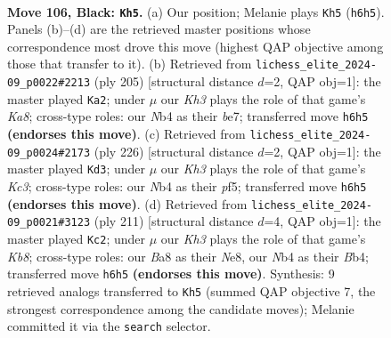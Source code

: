 \documentclass[11pt]{article}
\begin{document}
\clearpage

\begin{figure}[p]\centering
\begin{subfigure}{0.46\textwidth}\centering
\resizebox{\linewidth}{!}{%
\newchessgame
\chessboard[
  setfen={b7/8/7k/8/1n6/8/1B3P1K/8 b - - 58 106},
  showmover=false,
  pgfstyle=straightmove, color=movearrow, markmove={h6-h5}
]}
\caption{}
\end{subfigure}\hfill
\begin{subfigure}{0.46\textwidth}\centering
\resizebox{\linewidth}{!}{%
\newchessgame
\chessboard[
  setfen={8/4B3/bP6/8/8/2K5/8/k7 b - - 34 103},
  showmover=false,
  pgfstyle=straightmove, color=movearrow, markmove={a1-a2}
]}
\caption{}
\end{subfigure}
\\[4pt]
\begin{subfigure}{0.46\textwidth}\centering
\resizebox{\linewidth}{!}{%
\newchessgame
\chessboard[
  setfen={8/8/8/5p2/8/b1K3k1/8/5B2 w - - 8 114},
  showmover=false,
  pgfstyle=straightmove, color=movearrow, markmove={c3-d3}
]}
\caption{}
\end{subfigure}\hfill
\begin{subfigure}{0.46\textwidth}\centering
\resizebox{\linewidth}{!}{%
\newchessgame
\chessboard[
  setfen={4n3/8/4K1P1/8/1b6/3R4/8/1k6 b - - 12 106},
  showmover=false,
  pgfstyle=straightmove, color=movearrow, markmove={b1-c2}
]}
\caption{}
\end{subfigure}
\caption{\textbf{Move 106, Black: \texttt{Kh5}.} (a) Our position; Melanie plays \texttt{Kh5} (\texttt{h6h5}). Panels (b)--(d) are the retrieved master positions whose correspondence most drove this move (highest QAP objective among those that transfer to it). (b) Retrieved from \texttt{lichess\_elite\_2024-09\_p0022\#2213} (ply 205) [structural distance $d$=2, QAP obj=1]: the master played \texttt{Ka2}; under $\mu$ our \emph{Kh3} plays the role of that game's \emph{Ka8}; cross-type roles: our \emph{N}b4 as their \emph{b}e7; transferred move \texttt{h6h5} \textbf{(endorses this move)}. (c) Retrieved from \texttt{lichess\_elite\_2024-09\_p0024\#2173} (ply 226) [structural distance $d$=2, QAP obj=1]: the master played \texttt{Kd3}; under $\mu$ our \emph{Kh3} plays the role of that game's \emph{Kc3}; cross-type roles: our \emph{N}b4 as their \emph{p}f5; transferred move \texttt{h6h5} \textbf{(endorses this move)}. (d) Retrieved from \texttt{lichess\_elite\_2024-09\_p0021\#3123} (ply 211) [structural distance $d$=4, QAP obj=1]: the master played \texttt{Kc2}; under $\mu$ our \emph{Kh3} plays the role of that game's \emph{Kb8}; cross-type roles: our \emph{B}a8 as their \emph{N}e8, our \emph{N}b4 as their \emph{B}b4; transferred move \texttt{h6h5} \textbf{(endorses this move)}. Synthesis: 9 retrieved analogs transferred to \texttt{Kh5} (summed QAP objective 7, the strongest correspondence among the candidate moves); Melanie committed it via the \texttt{search} selector.}
\label{fig:thought-m211}
\end{figure}
\end{document}
